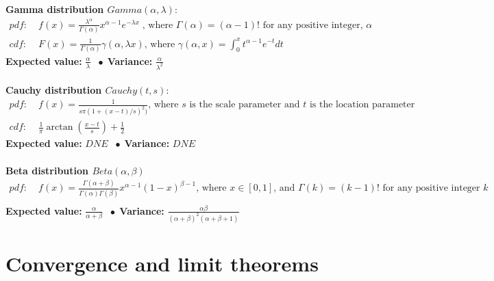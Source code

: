 \documentclass{article}
\newcommand{\bspace}{$\;\bullet\;$}
\begin{document}
\textbf{Gamma distribution $Gamma(\alpha, \lambda):$}
\begin{align*}
    pdf: & \; f(x) = \frac{\lambda^{\alpha}}{\Gamma(\alpha)}x^{\alpha-1} e^{-\lambda x} \; \textrm{, where } \Gamma(\alpha) = (\alpha - 1)! \textrm{ for any positive integer, } \alpha\\
    cdf: & \; F(x) =  \frac{1}{\Gamma(\alpha)}\gamma(\alpha, \lambda x) \textrm{, where } \gamma(\alpha, x) = \int_0^x t^{\alpha - 1}e^{-t}dt
\end{align*}
\textbf{Expected value:} $\frac{\alpha}{\lambda}$ \bspace \textbf{Variance:} $\frac{\alpha}{\lambda^2}$\\\\
\textbf{Cauchy distribution $Cauchy(t, s):$}
\begin{align*}
    pdf: & \; f(x) = \frac{1}{s \pi (1 + (x - t)/s)^2)} \textrm{, where } s \textrm{ is the scale parameter and } t \textrm{ is the location parameter}\\
    cdf: & \; \frac{1}{\pi} \arctan \left ( \frac{x - t}{s} \right ) + \frac{1}{2}
\end{align*}
\textbf{Expected value:} $DNE$ \bspace \textbf{Variance:} $DNE$\\\\
\textbf{Beta distribution $Beta(\alpha, \beta)$}
\begin{align*}
    pdf: & \; f(x) = \frac{\Gamma(\alpha + \beta)}{\Gamma(\alpha) \Gamma(\beta)} x^{\alpha - 1} (1-x)^{\beta - 1} \textrm{, where } x \in [0, 1] \textrm{, and } \Gamma(k) = (k - 1)! \textrm{ for any positive integer } k\\
\end{align*}
\textbf{Expected value:} $\frac{\alpha}{\alpha + \beta}$ \bspace \textbf{Variance:} $\frac{\alpha \beta}{(\alpha + \beta)^2(\alpha + \beta + 1)}$



\section{Convergence and limit theorems}
\end{document}
